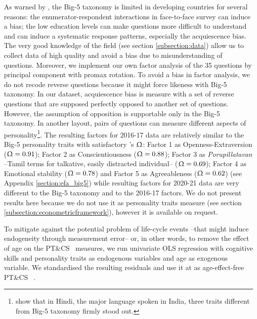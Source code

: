 \documentclass[a4paper, 12pt, onecolumn]{article}
\newcommand{\PTCS}{PT\&CS}
\begin{document}
As warned by \cite{Laajaj2019}, the Big-5 taxonomy is limited in developing countries for several reasons: the enumerator-respondent interactions in face-to-face survey can induce a bias; the low education levels can make questions more difficult to understand and can induce a systematic response patterns, especially the acquiescence bias.
The very good knowledge of the field (see section \ref{subsection:data}) allow us to collect data of high quality and avoid a bias due to misunderstanding of questions.
Moreover, we implement our own factor analysis of the 35 questions by principal component with promax rotation.
To avoid a bias in factor analysis, we do not recode reverse questions because it might force likeness with Big-5 taxonomy.
In our dataset, acquiescence bias is measure with a set of reverse questions that are supposed perfectly opposed to another set of questions. 
However, the assumption of opposition is supportable only in the Big-5 taxonomy.
In another layout, pairs of questions can measure different aspects of personality\footnote{\cite{Singh2013} show that in Hindi, the major language spoken in India, three traits different from Big-5 taxonomy firmly stood out.}.
The resulting factors for 2016-17 data are relatively similar to the Big-5 personality traits with satisfactory \citeauthor{McDonald1999}'s $\Upomega$: Factor 1 as Openness-Extraversion ($\Upomega=0.91$); Factor 2 as Conscientiousness ($\Upomega=0.88$); Factor 3 as \textit{Porupillatavan} --Tamil terms for talkative, easily distracted individual-- ($\Upomega=0.69$); Factor 4 as Emotional stability ($\Upomega=0.78$) and Factor 5 as Agreeableness ($\Upomega=0.62$) (see Appendix \ref{section:efa_big5}) while resulting factors for 2020-21 data are very different to the Big-5 taxonomy and to the 2016-17 factors.
We do not present results here because we do not use it as personality traits measure (see section \ref{subsection:econometricframework}), however it is available on request.

To mitigate against the potential problem of life-cycle events --that might induce endogeneity through measurement error-- or, in other words, to remove the effect of age on the \PTCS~ measures, we run univariate OLS regression with cognitive skills and personality traits as endogenous variables and age as exogenous variable. %
We standardised the resulting residuals and use it at as age-effect-free \PTCS~ \citep{Nyhus2005, Brown2014, Groves2005}. 
\end{document}
